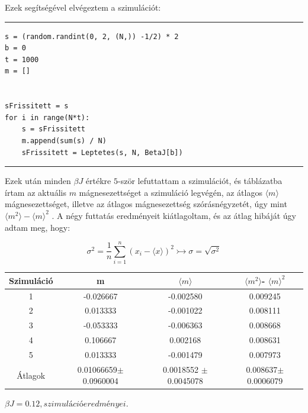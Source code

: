 \documentclass[a4paper, 12pt]{article}
\numberwithin{equation}{section}          %
\numberwithin{figure}{subsection}
\begin{document}
Ezek segítségével elvégeztem a szimulációt:
\newline
\rule{\textwidth}{0.1pt}
\begin{lstlisting}
s = (random.randint(0, 2, (N,)) -1/2) * 2   
b = 0                             
t = 1000                                    
m = []                                      


sFrissitett = s
for i in range(N*t):
	s = sFrissitett
	m.append(sum(s) / N)    
	sFrissitett = Leptetes(s, N, BetaJ[b])
\end{lstlisting}
\rule{\textwidth}{0.1pt}

Ezek után minden $\beta J$ értékre $5$-ször lefuttattam a szimulációt, és táblázatba írtam  az aktuális $m$ mágnesezettséget a szimuláció legvégén, az átlagos $\langle m \rangle$ mágnesezettséget, illetve az
átlagos mágnesezettség szórásnégyzetét, úgy mint $\langle m^2 \rangle - \langle m \rangle^2$ . A négy futtatás eredményeit kiátlagoltam,
és az átlag hibáját úgy adtam meg, hogy:

\begin{center}
	\begin{equation}
		\sigma^2= \frac{1}{n}\sum_{i=1}^{n}\left( x_i - \langle x \rangle \right)^2 \rightarrowtail \sigma = \sqrt{\sigma^2} 
	\end{equation}
\end{center}

\begin{center}
	\begin{tabular}{ ||c|c|c|c|| } 
		\hline
		Szimuláció &  m & $\langle m \rangle$ & $\langle m^2 \rangle$- $\langle m \rangle^2$\\ 
		\hline
		1 & -0.026667  & -0.002580 & 0.009245\\
		2 &  0.013333 & -0.001022 & 0.008111\\
		3 &  -0.053333 & -0.006363 & 0.008668\\
		4 &  0.106667 & 0.002168 & 0.008631\\
		5 &  0.013333 & -0.001479 & 0.007973\\
		\hline
		Átlagok & 0.01066659$\pm$ 0.0960004 & 0.0018552 $\pm$0.0045078 & 0.008637$\pm$0.0006079 \\
		\hline
	\end{tabular}\par
\bigskip
$\beta J = 0.12, szimuláció eredményei.$
\end{center}
\end{document}
